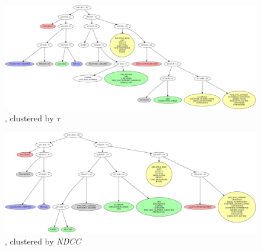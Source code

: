 \begin{figure}[th!]
  \begin{center}
  \includegraphics[angle=90,origin=c,height=0.6\textheight]{svg/rankingcom/patterns_prods_per_client2-global-KENDAL.pdf}
  \caption{\prodassocclient, clustered by $\tau$}
  \end{center}
\end{figure}

\begin{figure}[th!]
  \begin{center}
  \includegraphics[angle=90,origin=c,height=0.6\textheight]{svg/rankingcom/patterns_prods_per_client2-global-NDCG.pdf}
  \caption{\prodassocclient, clustered by {\em NDCC}}
  \end{center}
\end{figure}
